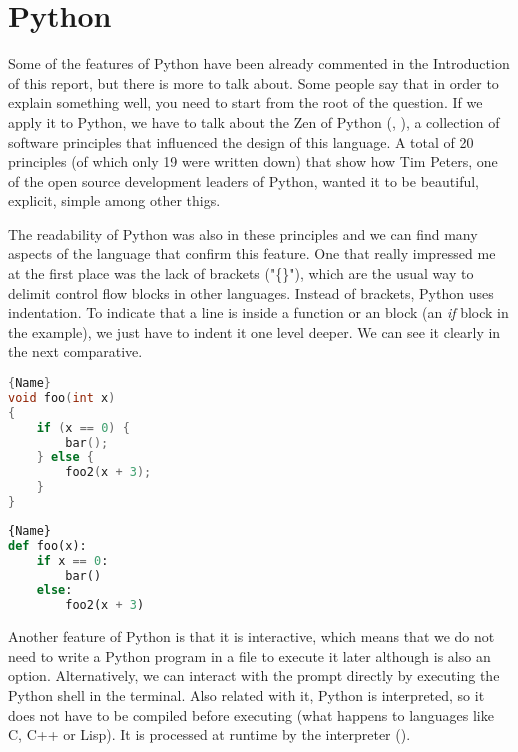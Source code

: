 \section{Python}
\label{sec:python}
Some of the features of Python have been already commented in the Introduction of this report, but there is more to talk about. Some people say that in order to explain something well, you need to start from the root of the question. If we apply it to Python, we have to talk about the Zen of Python (\cite{origin_zen_of_python}, \cite{zen_of_python}), a collection of software principles that influenced the design of this language. A total of 20 principles (of which only 19 were written down) that show how Tim Peters, one of the open source development leaders of Python, wanted it to be beautiful, explicit, simple among other thigs.

The readability of Python was also in these principles and we can find many aspects of the language that confirm this feature. One that really impressed me at the first place was the lack of brackets ("\{\}"), which are the usual way to delimit control flow blocks in other languages. Instead of brackets, Python uses indentation. To indicate that a line is inside a function or an block (an \textit{if} block in the example), we just have to indent it one level deeper. We can see it clearly in the next comparative.

\noindent\begin{minipage}[t]{.45\textwidth}
\begin{lstlisting}[caption=C code,frame=tlrb, language=C]{Name}
void foo(int x)
{
    if (x == 0) {
        bar();
    } else {
        foo2(x + 3);
    }
}
\end{lstlisting}
\end{minipage}\hfill
\begin{minipage}[t]{.45\textwidth}
\begin{lstlisting}[caption=Python code,frame=tlrb, language=Python]{Name}
def foo(x):
    if x == 0:
        bar()
    else:
        foo2(x + 3)
\end{lstlisting}
\end{minipage}

Another feature of Python is that it is interactive, which means that we do not need to write a Python program in a file to execute it later although is also an option. Alternatively, we can interact with the prompt directly by executing the Python shell in the terminal. Also related with it, Python is interpreted, so it does not have to be compiled before executing (what happens to languages like C, C++ or Lisp). It is processed at runtime by the interpreter (\cite{python_overview}). 

